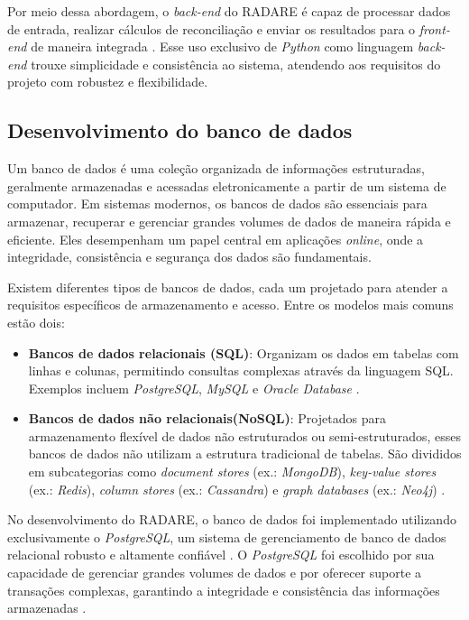 Por meio dessa abordagem, o \textit{back-end} do RADARE é capaz de processar dados de entrada, realizar cálculos de reconciliação e enviar os resultados para o \textit{front-end} de maneira integrada \cite{backendworkflow}. Esse uso exclusivo de \textit{Python} como linguagem \textit{back-end} trouxe simplicidade e consistência ao sistema, atendendo aos requisitos do projeto com robustez e flexibilidade.

\subsection{Desenvolvimento do banco de dados}

Um banco de dados é uma coleção organizada de informações estruturadas, geralmente armazenadas e acessadas eletronicamente a partir de um sistema de computador. Em sistemas modernos, os bancos de dados são essenciais para armazenar, recuperar e gerenciar grandes volumes de dados de maneira rápida e eficiente. Eles desempenham um papel central em aplicações \textit{online}, onde a integridade, consistência e segurança dos dados são fundamentais.

Existem diferentes tipos de bancos de dados, cada um projetado para atender a requisitos específicos de armazenamento e acesso. Entre os modelos mais comuns estão dois:

\begin{itemize}
	\item \textbf{Bancos de dados relacionais (SQL)}: Organizam os dados em tabelas com linhas e colunas, permitindo consultas complexas através da linguagem SQL. Exemplos incluem \textit{PostgreSQL}, \textit{MySQL} e \textit{Oracle Database} \cite{relationaldatabases}.

	\item \textbf{Bancos de dados não relacionais(NoSQL)}: Projetados para armazenamento flexível de dados não estruturados ou semi-estruturados, esses bancos de dados não utilizam a estrutura tradicional de tabelas. São divididos em subcategorias como \textit{document stores} (ex.: \textit{MongoDB}), \textit{key-value stores} (ex.: \textit{Redis}), \textit{column stores} (ex.: \textit{Cassandra}) e \textit{graph databases} (ex.: \textit{Neo4j}) \cite{nosqldatabases}.
\end{itemize}

No desenvolvimento do RADARE, o banco de dados foi implementado utilizando exclusivamente o \textit{PostgreSQL}, um sistema de gerenciamento de banco de dados relacional robusto e altamente confiável \cite{postgresql2024}. O \textit{PostgreSQL} foi escolhido por sua capacidade de gerenciar grandes volumes de dados e por oferecer suporte a transações complexas, garantindo a integridade e consistência das informações armazenadas \cite{acidtransactions}.

